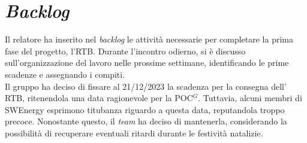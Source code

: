 \section{\textit{Backlog}}

Il relatore ha inserito nel \textit{backlog} le attività necessarie per
completare la prima fase del progetto, l'RTB. Durante l'incontro odierno, si è
discusso sull'organizzazione del lavoro nelle prossime settimane,
identificando le prime scadenze e assegnando i compiti. \\
Il gruppo ha deciso di fissare al 21/12/2023 la scadenza per la consegna dell'
RTB, ritenendola una data ragionevole per la \gls{POC}$^G$. Tuttavia, alcuni membri di
SWEnergy esprimono titubanza riguardo a questa data, reputandola troppo precoce.
Nonostante questo, il \textit{team} ha deciso di mantenerla, considerando la
possibilità di recuperare eventuali ritardi durante le festività natalizie.
